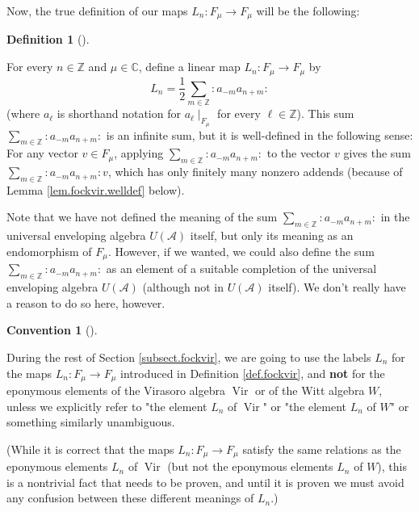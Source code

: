 \documentclass
[numbers=enddot,12pt,final,onecolumn,german,notitlepage]{scrartcl}%
\theoremstyle{definition}
\newtheorem{defi}[theo]{Definition}
\newenvironment{definition}[1][]
{\begin{defi}[#1]\begin{leftbar}}
{\end{leftbar}\end{defi}}
\newtheorem{conv}[theo]{Convention}
\newenvironment{Convention}[1][]
{\begin{conv}[#1]\begin{leftbar}}
{\end{leftbar}\end{conv}}
\begin{document}
Now, the true definition of our maps $L_{n}:F_{\mu}\rightarrow F_{\mu}$ will
be the following:

\begin{definition}
\label{def.fockvir}For every $n\in\mathbb{Z}$ and $\mu\in\mathbb{C}$, define a
linear map $L_{n}:F_{\mu}\rightarrow F_{\mu}$ by%
\[
L_{n}=\dfrac{1}{2}\sum\limits_{m\in\mathbb{Z}}\left.  :a_{-m}a_{n+m}:\right.
\]
(where $a_{\ell}$ is shorthand notation for $a_{\ell}\mid_{F_{\mu}}$ for every
$\ell\in\mathbb{Z}$). This sum $\sum\limits_{m\in\mathbb{Z}}\left.
:a_{-m}a_{n+m}:\right.  $ is an infinite sum, but it is well-defined in the
following sense: For any vector $v\in F_{\mu}$, applying $\sum\limits_{m\in
\mathbb{Z}}\left.  :a_{-m}a_{n+m}:\right.  $ to the vector $v$ gives the sum
$\sum\limits_{m\in\mathbb{Z}}\left.  :a_{-m}a_{n+m}:\right.  v$, which has
only finitely many nonzero addends (because of Lemma \ref{lem.fockvir.welldef} below).
\end{definition}

Note that we have not defined the meaning of the sum $\sum\limits_{m\in
\mathbb{Z}}\left.  :a_{-m}a_{n+m}:\right.  $ in the universal enveloping
algebra $U\left(  \mathcal{A}\right)  $ itself, but only its meaning as an
endomorphism of $F_{\mu}$. However, if we wanted, we could also define the sum
$\sum\limits_{m\in\mathbb{Z}}\left.  :a_{-m}a_{n+m}:\right.  $ as an element
of a suitable completion of the universal enveloping algebra $U\left(
\mathcal{A}\right)  $ (although not in $U\left(  \mathcal{A}\right)  $
itself). We don't really have a reason to do so here, however.

\begin{Convention}
\label{conv.fockvir.L}During the rest of Section \ref{subsect.fockvir}, we are
going to use the labels $L_{n}$ for the maps $L_{n}:F_{\mu}\rightarrow F_{\mu
}$ introduced in Definition \ref{def.fockvir}, and \textbf{not} for the
eponymous elements of the Virasoro algebra $\operatorname*{Vir}$ or of the
Witt algebra $W$, unless we explicitly refer to "the element $L_{n}$ of
$\operatorname*{Vir}$" or "the element $L_{n}$ of $W$" or something similarly unambiguous.

(While it is correct that the maps $L_{n}:F_{\mu}\rightarrow F_{\mu}$ satisfy
the same relations as the eponymous elements $L_{n}$ of $\operatorname*{Vir}$
(but not the eponymous elements $L_{n}$ of $W$), this is a nontrivial fact
that needs to be proven, and until it is proven we must avoid any confusion
between these different meanings of $L_{n}$.)
\end{Convention}
\end{document}
